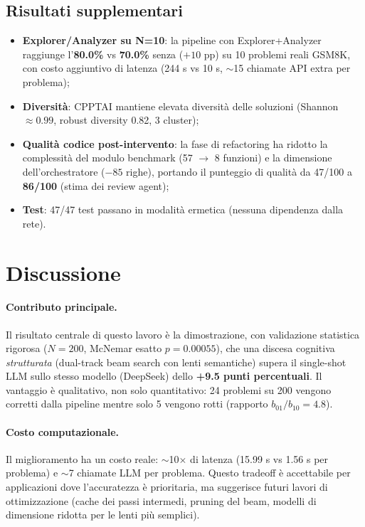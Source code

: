 \documentclass[11pt,a4paper]{article}
\begin{document}
\subsection{Risultati supplementari}

\begin{itemize}[leftmargin=1.2em]
  \item \textbf{Explorer/Analyzer su N=10}: la pipeline con Explorer+Analyzer
        raggiunge l'\textbf{80.0\%} vs \textbf{70.0\%} senza ($+10$ pp) su 10
        problemi reali GSM8K, con costo aggiuntivo di latenza
        (244 s vs 10 s, $\sim$15 chiamate API extra per problema);
  \item \textbf{Diversità}: CPPTAI mantiene elevata diversità delle soluzioni
        (Shannon $\approx 0.99$, robust diversity 0.82, 3 cluster);
  \item \textbf{Qualità codice post-intervento}: la fase di refactoring ha
        ridotto la complessità del modulo benchmark (57 $\rightarrow$ 8 funzioni)
        e la dimensione dell'orchestratore ($-85$ righe), portando il punteggio
        di qualità da 47/100 a \textbf{86/100} (stima dei review agent);
  \item \textbf{Test}: 47/47 test passano in modalità ermetica (nessuna
        dipendenza dalla rete).
\end{itemize}

\section{Discussione}
\label{sec:discussione}

\paragraph{Contributo principale.}
Il risultato centrale di questo lavoro è la dimostrazione, con validazione
statistica rigorosa ($N=200$, McNemar esatto $p = 0.00055$), che una discesa
cognitiva \emph{strutturata} (dual-track beam search con lenti semantiche)
supera il single-shot LLM sullo stesso modello (DeepSeek) dello
\textbf{+9.5 punti percentuali}. Il vantaggio è qualitativo, non solo
quantitativo: 24 problemi su 200 vengono corretti dalla pipeline mentre solo
5 vengono rotti (rapporto $b_{01}/b_{10} = 4.8$).

\paragraph{Costo computazionale.}
Il miglioramento ha un costo reale: $\sim$10$\times$ di latenza (15.99 s vs
1.56 s per problema) e $\sim$7 chiamate LLM per problema. Questo tradeoff è
accettabile per applicazioni dove l'accuratezza è prioritaria, ma suggerisce
futuri lavori di ottimizzazione (cache dei passi intermedi, pruning del beam,
modelli di dimensione ridotta per le lenti più semplici).
\end{document}
